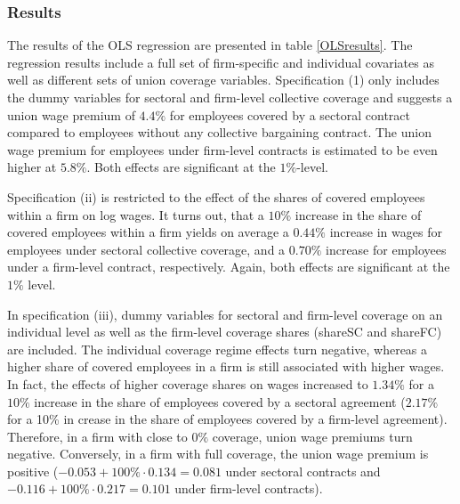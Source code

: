 \subsubsection*{Results}


The results of the OLS regression are presented in table \ref{OLSresults}. The regression results include a full set of firm-specific and individual covariates as well as different sets of union coverage variables. Specification (1) only includes the dummy variables for sectoral and firm-level collective coverage and suggests a union wage premium of $4.4\%$ for employees covered by a sectoral contract compared to employees without any collective bargaining contract. The union wage premium for employees under firm-level contracts is estimated to be even higher at $5.8\%$. Both effects are significant at the $1\%$-level.

Specification (ii) is restricted to the effect of the shares of covered employees within a firm on log wages. It turns out, that a $10\%$ increase in the share of covered employees within a firm yields on average a $0.44\%$ increase in wages for employees under sectoral collective coverage, and a $0.70\%$ increase for employees under a firm-level contract, respectively. Again, both effects are significant at the $1\%$ level.

In specification (iii), dummy variables for sectoral and firm-level coverage on an individual level as well as the firm-level coverage shares (shareSC and shareFC) are included. The individual coverage regime effects turn negative, whereas a higher share of covered employees in a firm is still associated with higher wages. In fact, the effects of higher coverage shares on wages increased to $1.34\%$ for a $10\%$ increase in the share of employees covered by a sectoral agreement ($2.17\%$ for a 10\% in crease in the share of employees covered by a firm-level agreement). Therefore, in a firm with close to $0\%$ coverage, union wage premiums turn negative. Conversely, in a firm with full coverage, the union wage premium is positive ($-0.053+100\% \cdot 0.134=0.081$ under sectoral contracts and $-0.116 +100\% \cdot 0.217=0.101$ under firm-level contracts).

